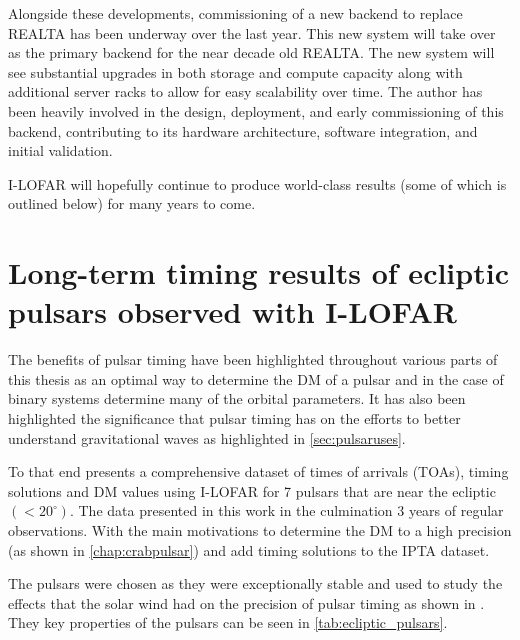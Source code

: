 Alongside these developments, commissioning of a new backend to replace REALTA has been underway over the last year. This new system will take over as the primary backend for the near decade old REALTA. The new system will see substantial upgrades in both storage and compute capacity along with additional server racks to allow for easy scalability over time. The author has been heavily involved in the design, deployment, and early commissioning of this backend, contributing to its hardware architecture, software integration, and initial validation.

I-LOFAR will hopefully continue to produce world-class results (some of which is outlined below) for many years to come.

\newpage


\newpage 




\newpage
\section{Long-term timing results of ecliptic pulsars observed with I-LOFAR}

The benefits of pulsar timing have been highlighted throughout various parts of this thesis as an optimal way to determine the DM of a pulsar and in the case of binary systems determine many of the orbital parameters. It has also been highlighted the significance that pulsar timing has on the efforts to better understand gravitational waves as highlighted in \cref{sec:pulsaruses}. 

To that end \cite{susarla_long-term_2025} presents a comprehensive dataset of times of arrivals (TOAs), timing solutions and DM values using I-LOFAR for 7 pulsars that are near the ecliptic $(<20^{\circ})$. The data presented in this work in the culmination 3 years of regular observations. With the main motivations to determine the DM to a high precision (as shown in \cref{chap:crabpulsar}) and add timing solutions to the IPTA dataset. 

The pulsars were chosen as they were exceptionally stable and used to study the effects that the solar wind had on the precision of pulsar timing as shown in \cite{susarla_exploring_2024}. They key properties of the pulsars can be seen in \cref{tab:ecliptic_pulsars}. 


